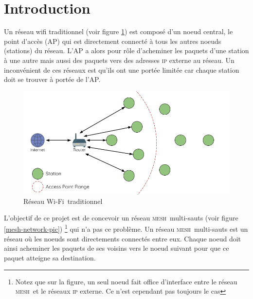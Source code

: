 \documentclass[a4paper, 12pt]{report}
\newcommand{\mesh}{\textsc{mesh}}
\newcommand{\wifi}{Wi-Fi}
\begin{document}
\chapter*{Introduction}
    Un réseau wifi traditionnel (voir figure \ref{traditional-network-pic}) est composé
    d'un noeud central, le point d'accès (AP) qui est
    directement connecté à tous les autres noeuds (stations) du réseau.
    L'AP a alors pour rôle d'acheminer les paquets d'une station à une autre
    mais aussi des paquets vers des adresses \textsc{ip} externe au réseau.
    Un inconvénient de ces réseaux est qu'ils ont une portée limitée car chaque station
    doit se trouver à portée de l'AP.\\

    \begin{figure}[H]
        \centering
        \includegraphics[scale=0.4]{images/traditional-network-architecture.png}
        \caption{Réseau \wifi\ traditionnel \cite{esp-mesh_w}}
        \label{traditional-network-pic}
    \end{figure}

    L'objectif de ce projet est de concevoir un réseau \mesh\ multi-sauts (voir figure \ref{mesh-network-pic})
    \footnote{Notez que sur la figure, un seul noeud fait office d'interface
    entre le réseau \mesh\ et le réseaux \textsc{ip} externe. Ce n'est cependant pas toujours
    le cas} qui n'a pas ce problème. Un réseau \mesh\ multi-sauts est un réseau où les noeuds
    sont directements connectés entre eux. Chaque noeud doit ainsi acheminer
    les paquets de ses voisins vers le noeud suivant pour que ce paquet atteigne
    sa destination.\\
\end{document}
